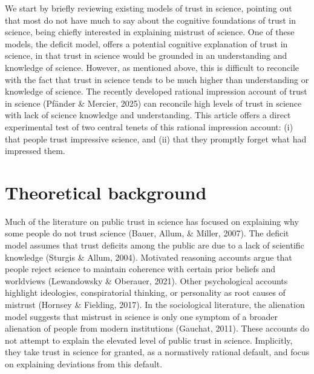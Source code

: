 \documentclass[
  english,
  doc,floatsintext]{apa6}
\begin{document}
We start by briefly reviewing existing models of trust in science, pointing out that most do not have much to say about the cognitive foundations of trust in science, being chiefly interested in explaining mistrust of science. One of these models, the deficit model, offers a potential cognitive explanation of trust in science, in that trust in science would be grounded in an understanding and knowledge of science. However, as mentioned above, this is difficult to reconcile with the fact that trust in science tends to be much higher than understanding or knowledge of science. The recently developed rational impression account of trust in science (Pfänder \& Mercier, 2025) can reconcile high levels of trust in science with lack of science knowledge and understanding. This article offers a direct experimental test of two central tenets of this rational impression account: (i) that people trust impressive science, and (ii) that they promptly forget what had impressed them.

\section{Theoretical background}\label{theoretical-background}

Much of the literature on public trust in science has focused on explaining why some people do not trust science (Bauer, Allum, \& Miller, 2007). The deficit model assumes that trust deficits among the public are due to a lack of scientific knowledge (Sturgis \& Allum, 2004). Motivated reasoning accounts argue that people reject science to maintain coherence with certain prior beliefs and worldviews (Lewandowsky \& Oberauer, 2021). Other psychological accounts highlight ideologies, conspiratorial thinking, or personality as root causes of mistrust (Hornsey \& Fielding, 2017). In the sociological literature, the alienation model suggests that mistrust in science is only one symptom of a broader alienation of people from modern institutions (Gauchat, 2011). These accounts do not attempt to explain the elevated level of public trust in science. Implicitly, they take trust in science for granted, as a normatively rational default, and focus on explaining deviations from this default.
\end{document}
